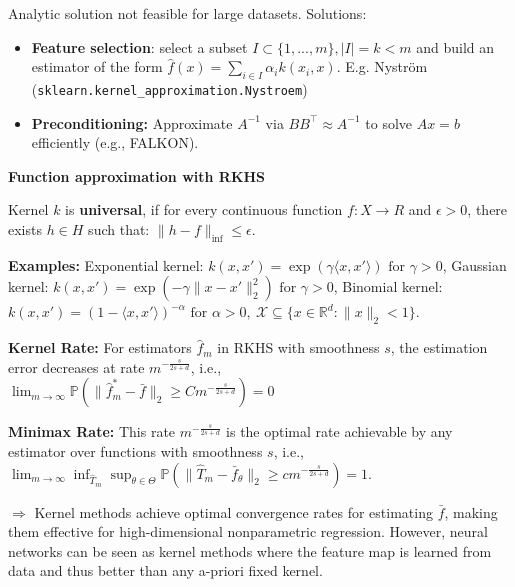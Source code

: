 \documentclass[a4paper,10pt]{article}
\newenvironment{myitemize}
{\vspace{-0.25cm}\begin{itemize}}
{\end{itemize}}
\newcommand{\subtitle}[1]{\begin{normalsize}\vspace{0.25cm}\textbf{#1} \end{normalsize}}
\begin{document}
\begin{small}
\vspace{0.1cm}
Analytic solution not feasible for large datasets. Solutions:

\begin{myitemize}
    \item \textbf{Feature selection}: select a subset $I \subset \{1,..., m\}, |I|= k < m$ and build an estimator of the form $\hat{f}(x) = \sum_{i \in I} \alpha_i k(x_i, x)$. E.g. Nyström (\texttt{sklearn.kernel\_approximation.Nystroem})
    \item\textbf{Preconditioning:} Approximate $A^{-1}$ via $BB^\top \approx A^{-1}$ to solve $Ax = b$ efficiently (e.g., FALKON).
\end{myitemize}

\subtitle{Function approximation with RKHS}

Kernel $k$ is \textbf{universal}, if for every continuous function $f : X \to R$ and $\epsilon > 0$, there exists $h \in H$ such that: $\|h -f \|_{\inf} \leq \epsilon$. 

\textbf{Examples:}  Exponential kernel: $k(x, x') = \exp(\gamma \langle x, x' \rangle) \text{ for } \gamma > 0$, 
Gaussian kernel: $k(x, x') = \exp\left(-\gamma \|x - x'\|_2^2\right) \text{ for } \gamma > 0$, 
Binomial kernel: $k(x, x') = (1 - \langle x, x' \rangle)^{-\alpha} \text{ for } \alpha > 0, \ \mathcal{X} \subseteq \{x \in \mathbb{R}^d : \|x\|_2 < 1\}$.


\textbf{Kernel Rate:} For estimators $ \hat{f}_m $ in RKHS with smoothness $ s $, the estimation error decreases at rate $ m^{-\frac{s}{2s + d}} $, i.e., \\
$
\lim_{m \to \infty} \mathbb{P} \left( \| \hat{f}_m^* - \bar{f} \|_2 \geq C m^{-\frac{s}{2s + d}} \right) = 0
$

\textbf{Minimax Rate:} This rate $ m^{-\frac{s}{2s + d}} $ is the optimal rate achievable by any estimator over functions with smoothness $ s $, i.e., 
$
\lim_{m \to \infty} \inf_{\hat{T}_m} \sup_{\theta \in \Theta} \mathbb{P} \left( \| \hat{T}_m - \bar{f}_\theta \|_2 \geq c m^{-\frac{s}{2s + d}} \right) = 1.
$

$\Rightarrow$ Kernel methods achieve optimal convergence rates for estimating $ \bar{f} $, making them effective for high-dimensional nonparametric regression. However, neural networks can be seen as kernel methods where the feature map is learned from data and thus better than any a-priori fixed kernel.

\end{small}
\end{document}
